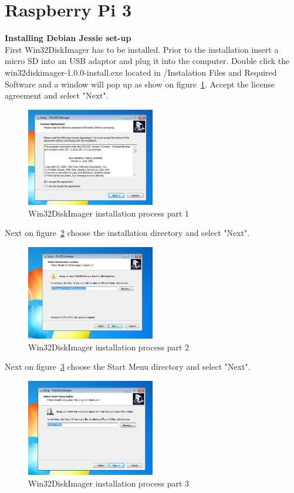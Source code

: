 \documentclass[12pt,]{article}
\begin{document}
\section*{Raspberry Pi 3}
\textbf{Installing Debian Jessie set-up}\\
First Win32DiskImager has to be installed. Prior to the installation insert a micro SD into an USB adaptor and plug it into the computer.
Double click the win32diskimager-1.0.0-install.exe located in /Instalation Files and Required Software and a window will pop up as show on figure~\ref{fig:1}. Accept the license agreement and select "Next".
\begin{figure}[H]
  	\begin{center}
    	\includegraphics[width=0.5\textwidth]{Win32_1}
  	\end{center}
  	\caption{Win32DiskImager installation process part 1}
	\label{fig:1}
\end{figure}
Next on figure~\ref{fig:2} choose the installation directory and select "Next".
\begin{figure}[H]
  	\begin{center}
    	\includegraphics[width=0.5\textwidth]{Win32_2}
  	\end{center}
  	\caption{Win32DiskImager installation process part 2}
	\label{fig:2}
\end{figure}
Next on figure~\ref{fig:3} choose the Start Menu directory and select "Next".
\begin{figure}[H]
  	\begin{center}
    	\includegraphics[width=0.5\textwidth]{Win32_3}
  	\end{center}
  	\caption{Win32DiskImager installation process part 3}
	\label{fig:3}
\end{figure}
\end{document}

